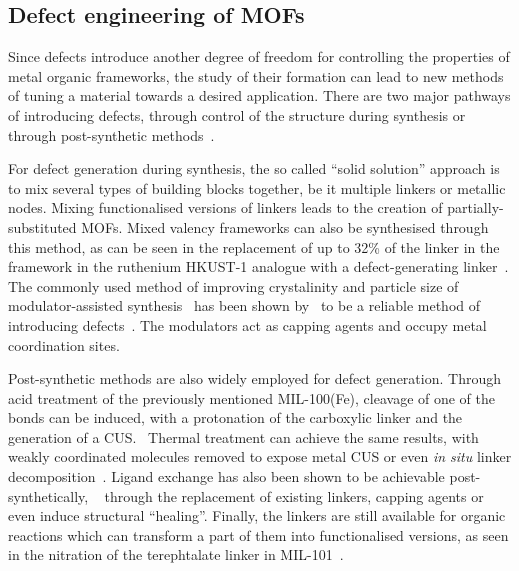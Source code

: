 \subsection{Defect engineering of MOFs}

Since defects introduce another degree of freedom
for controlling the properties of metal organic frameworks, the
study of their formation can lead to new methods of tuning
a material towards a desired application.
There are two major pathways of introducing defects, through
control of the structure during synthesis or through post-synthetic
methods~\cite{fangDefectEngineeredMetalOrganicFrameworks2015}.

For defect generation during synthesis, the so called
``solid solution'' approach is to mix several types of
building blocks together, be it multiple linkers or
metallic nodes. Mixing functionalised versions of linkers
leads to the creation of partially-substituted MOFs.
Mixed valency frameworks can also be synthesised through
this method, as can be seen in the replacement of up to 32\% of the
linker in the framework in the ruthenium HKUST-1
analogue with a defect-generating
linker~\cite{zhangRutheniumMetalOrganicFrameworks2016}.
The commonly used method of improving crystalinity and
particle size of modulator-assisted
synthesis~\cite{schaateModulatedSynthesisZrBased2011} has been shown
by~\citeauthor{shearerDefectEngineeringTuning2016}
to be a reliable method of introducing
defects~\cite{shearerDefectEngineeringTuning2016}.
The modulators act as capping agents and occupy metal coordination sites.

Post-synthetic methods are also widely employed for defect
generation. Through acid treatment of the previously mentioned
MIL-100(Fe), cleavage of one of the  bonds can be
induced, with a protonation of the carboxylic linker and the
generation of a CUS.~\cite{vermoorteleTuningCatalyticPerformance2012}
Thermal treatment can achieve the same results, with weakly coordinated
molecules removed to expose metal CUS or even \textit{in situ}
linker decomposition~\cite{gadipelliPostsynthesisAnnealingMOF52014}.
Ligand exchange has also been shown to be achievable post-synthetically,
~\cite{shearerFunctionalizingDefectsPostsynthetic2016} through the
replacement of existing linkers, capping agents or even induce
structural ``healing''. Finally, the linkers are still available 
for organic reactions which can transform a part of them into
functionalised versions, as seen in the nitration of the 
terephtalate linker in MIL-101~\cite{berntDirectCovalentPostsynthetic2011}.

